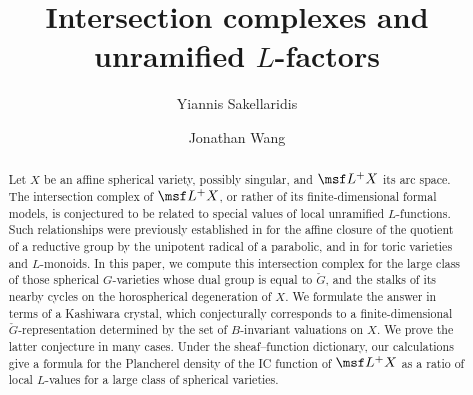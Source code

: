 \documentclass[final]{amsart}
\title{Intersection complexes and unramified $L$-factors}
\author{Yiannis Sakellaridis}
\author{Jonathan Wang}
\theoremstyle{remark}
\theoremstyle{definition}
\numberwithin{equation}{section}
\begin{document}
 

\begin{abstract}
%
Let $X$ be an affine spherical variety, possibly singular, and $\msf L^+X$ its arc space. The intersection complex of $\msf L^+X$, or rather of its finite-dimensional formal models, is conjectured to be related to special values of local unramified $L$-functions. Such relationships were previously established in \cite{BFGM} for the affine closure of the quotient of a reductive group by the unipotent radical of a parabolic, and in \cite{BNS} for toric varieties and $L$-monoids. In this paper, we compute this intersection complex for the large class of those spherical $G$-varieties whose dual group is equal to $\check G$, and the stalks of its nearby cycles on the horospherical degeneration of $X$. We formulate the answer in terms of a Kashiwara crystal, which conjecturally corresponds to a finite-dimensional $\check G$-representation determined by the set of $B$-invariant valuations on $X$. 
We prove the latter conjecture in many cases. Under the sheaf--function dictionary,
our calculations give a formula for the Plancherel density of the IC function
of $\msf L^+X$ as a ratio of local $L$-values for a large class of spherical varieties.
\end{abstract}


\maketitle
\end{document}
